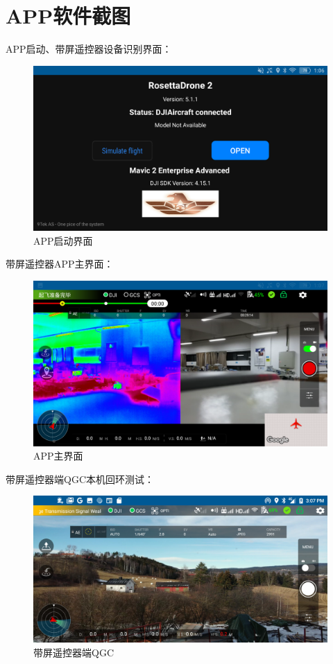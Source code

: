 \section{APP软件截图}
APP启动、带屏遥控器设备识别界面：

\begin{figure}[H]
    \centering
    \includegraphics[width=0.8\linewidth]{./Figure/APP_Register_Page.png}
    \caption{APP启动界面}\label{Fig:append_img3}
\end{figure}

带屏遥控器APP主界面：

\begin{figure}[H]
  \centering
  \includegraphics[width=0.8\linewidth]{./Figure/APP_Main_Page.png}
  \caption{APP主界面}\label{Fig:append_img4}
\end{figure}

带屏遥控器端QGC本机回环测试：

\begin{figure}[ht]
  \centering
  \includegraphics[width=0.8\linewidth]{./Figure/QGC_Controller_Main_Page.png}
  \caption{带屏遥控器端QGC}\label{Fig:append_img5}
\end{figure}

